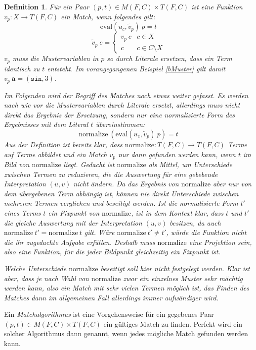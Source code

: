 \newtheorem{defMatch}[bsp]{Definition}
\begin{defMatch}
Für ein Paar $(p, t) \in M(F, C) \times T(F, C)$ ist eine Funktion $v_p \colon X \rightarrow T(F, C)$ ein \emph{Match}, wenn folgendes gilt:
$$\mathrm{eval}(u_c, \tilde v_p)~ p = t$$
$$\tilde v_p~ c = \begin{cases}
	v_p~ c & c \in X\\
	c      & c \in C \setminus X
\end{cases}$$
$v_p$ muss die Mustervariablen in $p$ so durch Literale ersetzen, dass ein Term identisch zu $t$ entsteht. 
Im vorangegangenen Beispiel \ref{bMuster} gilt damit $v_p~ \mathbf a = (\texttt{sin}, 3)$.

Im Folgenden wird der Begriff des Matches noch etwas weiter gefasst. Es werden nach wie vor die Mustervariablen durch Literale ersetzt, allerdings muss nicht direkt das Ergebnis der Ersetzung, sondern nur eine normalisierte Form des Ergebnisses mit dem Literal $t$ übereinstimmen:
$$\mathrm{normalize}~(\mathrm{eval}(u_c, \tilde v_p)~ p) = t$$
Aus der Definition ist bereits klar, dass $\mathrm{normalize} \colon T(F, C) \rightarrow T(F, C)$ Terme auf Terme abbildet und ein Match $v_p$ nur dann gefunden werden kann, wenn $t$ im Bild von $\mathrm{normalize}$ liegt. 
Gedacht ist $\mathrm{normalize}$ als Mittel, um Unterschiede zwischen Termen zu reduzieren, die die Auswertung für eine gebebende Interpretation $(u, v)$ nicht ändern. Da das Ergebnis von $\mathrm{normalize}$ aber nur von dem übergebenen Term abhängig ist, können nie direkt Unterschiede zwischen mehreren Termen verglichen und beseitigt werden. Ist die normalisierte Form $t'$ eines Terms $t$ ein Fixpunkt von $\mathrm{normalize}$, ist in dem Kontext klar, dass $t$ und $t'$ die gleiche Auswertung mit der Interpretation $(u, v)$ besitzen, da auch $\mathrm{normalize}~t' = \mathrm{normalize}~t$ gilt. Wäre $\mathrm{normalize}~t' \neq t'$, würde die Funktion nicht die ihr zugedachte Aufgabe erfüllen. Deshalb muss $\mathrm{normalize}$ eine Projektion sein, also eine Funktion, für die jeder Bildpunkt gleichzeitig ein Fixpunkt ist. 

Welche Unterschiede $\mathrm{normalize}$ beseitigt soll hier nicht festgelegt werden. Klar ist aber, dass je nach Wahl von $\mathrm{normalize}$ zwar ein einzelnes Muster sehr mächtig werden kann, also ein Match mit sehr vielen Termen möglich ist, das Finden des Matches dann im allgemeinen Fall allerdings immer aufwändiger wird. 

\end{defMatch}

Ein \emph{Matchalgorithmus} ist eine Vorgehensweise für ein gegebenes Paar $(p, t) \in M(F, C) \times T(F, C)$ ein gültiges Match zu finden. Perfekt wird ein solcher Algorithmus dann genannt, wenn jedes mögliche Match gefunden werden kann.


